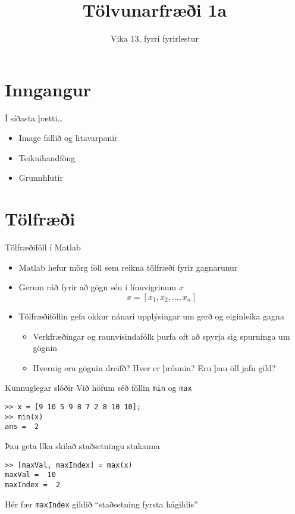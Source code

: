\documentclass[handout]{beamer}
\title{Tölvunarfræði 1a}
\subtitle{Vika 13, fyrri fyrirlestur}
\begin{document}
\begin{frame}
\titlepage
\end{frame}

\section{Inngangur}

\begin{frame}{Í síðasta þætti\ldots}
\begin{itemize}
 \item Image fallið og litavarpanir
 \item Teiknihandföng
 \item Grunnhlutir 
\end{itemize}
\end{frame}

\section{Tölfræði}

\begin{frame}{Tölfræðiföll í Matlab}
\begin{itemize}
 \item Matlab hefur mörg föll sem reikna tölfræði fyrir gagnarunur
 \item Gerum ráð fyrir að gögn séu í línuvigrinum $x$
\[
 x = [x_1,x_2, \ldots, x_n]
\]
 \item Tölfræðiföllin gefa okkur nánari upplýsingar um gerð og eiginleika gagna
 \begin{itemize}
  \item Verkfræðingar og raunvísindafólk þurfa oft að spyrja sig spurninga um gögnin
  \item Hvernig eru gögnin dreifð? Hver er þróunin? Eru þau öll jafn gild?
 \end{itemize}
\end{itemize}

\end{frame}

\begin{frame}[fragile]{Kunnuglegar slóðir}
Við höfum séð föllin \texttt{min} og \texttt{max}
\begin{verbatim}
>> x = [9 10 5 9 8 7 2 8 10 10];
>> min(x)
ans =  2
\end{verbatim}
Þau geta líka skilað staðsetningu stakanna
\begin{verbatim}
>> [maxVal, maxIndex] = max(x)
maxVal =  10
maxIndex =  2
\end{verbatim}
Hér fær \texttt{maxIndex} gildið ``staðsetning fyrsta hágildis''
\end{frame}
\end{document}
